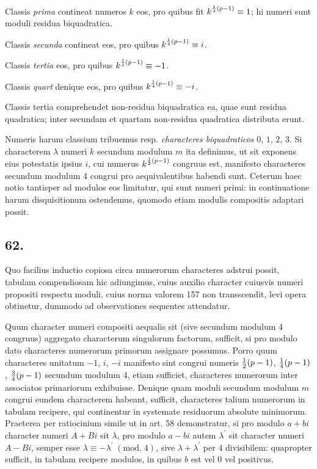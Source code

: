 \documentclass[twoside,12pt]{memoir}
\renewcommand{\pmod}[1]{\;(\textrm{mod.}\;#1)}
\let\oldfrac\frac
\def\frac#1#2{\mathchoice{\tfrac{#1}{#2}}{\oldfrac{#1}{#2}}{\genfrac{}{}{}{2}{#1}{#2\mathstrut}}{\genfrac{}{}{}{3}{#1}{#2\mathstrut}}}
\begin{document}
Classis \textit{prima} contineat numeros \(k\) eos, pro quibus fit \(k^{\frac{1}{4}(p-1)} \equiv 1\); hi numeri sunt moduli residua biquadratica.
 
Classis \textit{secunda} contineat eos, pro quibus \(k^{\frac{1}{4}(p-1)} \equiv i\).
 
Classis \textit{tertia} eos, pro quibus \(k^{\frac{1}{4}(p-1)} \equiv-1\).
 
Classis \textit{quart} denique eos, pro quibus \(k^{\frac{1}{4}(p-1)} \equiv-i\).
 
Classis tertia comprehendet non-residua biquadratica ea, quae sunt residua quadratica; inter secundam et quartam non-residua quadratica distributa erunt.
 
Numeris harum classium tribuemus resp. \textit{characteres biquadraticos} \(0\), \(1\), \(2\), \(3\). Si characterem \(\lambda\) numeri \(k\) secundum modulum \(m\) ita definimus, ut sit exponens eius potestatis ipsius \(i\), cui numerus \(k^{\frac{1}{2}(p-1)}\) congruus est, manifesto characteres secundum modulum 4 congrui pro aequivalentibus habendi sunt. Ceterum haec notio tantisper ad modulos eos limitatur, qui sunt numeri primi: in continuatione harum disquisitionum ostendemus, quomodo etiam modulis compositis adaptari possit.

\subsection*{62.}
 
Quo facilius inductio copiosa circa numerorum characteres adstrui possit, tabulam compendiosam hic adiungimus, cuius auxilio character cuiusvis numeri propositi respectu moduli, cuius norma valorem 157 non transscendit, levi opera obtinetur, dummodo ad observationes sequentes attendatur.\pagebreak%
 
Quum character numeri compositi aequalis sit (sive secundum modulum 4 congruus) aggregato characterum singulorum factorum, sufficit, si pro modulo dato characteres numerorum primorum assignare possumus. Porro quum characteres unitatum \(-1\), \( i\), \(-i\) manifesto sint congrui numeris \(\frac{1}{2}(p-1)\), \( \frac{1}{4}(p-1)\), \( \frac{3}{4}(p-1)\) secundum modulum 4, etiam sufficiet, characteres numerorum inter associatos primariorum exhibuisse. Denique quam moduli secundum modulum \(m\) congrui eundem characterem habeant, sufficit, characteres talium numerorum in tabulam recipere, qui continentur in systemate residuorum absolute minimorum. Praeterea per ratiocinium simile ut in art. 58 demonstratur, si pro modulo \(a+b i\) character numeri \(A+B i\) sit \(\lambda\), pro modulo \(a-b i\) autem \(\lambda^{\prime}\) sit character numeri \(A-B i\), semper esse \(\lambda \equiv-\lambda^{\prime}\pmod{4}\), sive \(\lambda+\lambda^{\prime}\) per 4 divisibilem: quapropter sufficit, in tabulam recipere modulos, in quibus \(b\) est vel \(0\) vel positivus.
\end{document}
